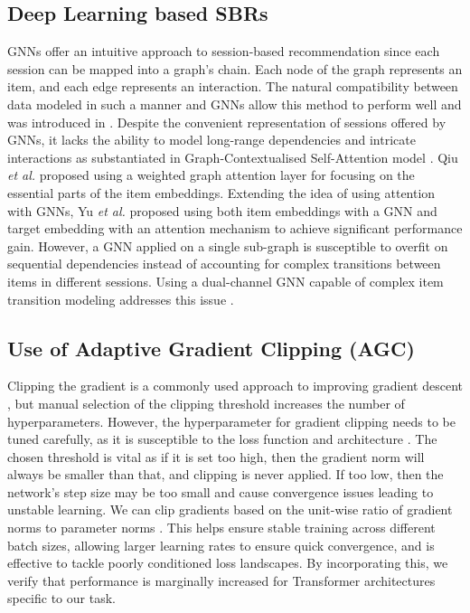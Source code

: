 \documentclass[conference]{IEEEtran}
\begin{document}
\subsection{Deep Learning based SBRs}




GNNs offer an intuitive approach to session-based recommendation since each session can be mapped into a graph's chain. Each node of the graph represents an item, and each edge represents an interaction. The natural compatibility between data modeled in such a manner and GNNs allow this method to perform well and was introduced in \cite{Wu:2019ke}. Despite the convenient representation of sessions offered by GNNs, it lacks the ability to model long-range dependencies and intricate interactions as substantiated in Graph-Contextualised Self-Attention model \cite{ijcai2019-547}. Qiu \textit{et al.} \cite{Rethinking} proposed using a weighted graph attention layer for focusing on the essential parts of the item embeddings. Extending the idea of using attention with GNNs, Yu \textit{et al.}\cite{yu2020tagnn} proposed using both item embeddings with a GNN and target embedding with an attention mechanism to achieve significant performance gain. However, a GNN applied on a single sub-graph is susceptible to overfit on sequential dependencies instead of accounting for complex transitions between items in different sessions. Using a dual-channel GNN capable of complex item transition modeling addresses this issue \cite{dgtn}. 









\subsection{Use of Adaptive Gradient Clipping (AGC)}

Clipping the gradient is a commonly used approach to improving gradient descent \cite{Zhang2020WhyGC}, but manual selection of the clipping threshold increases the number of hyperparameters. However, the hyperparameter for gradient clipping needs to be tuned carefully, as it is susceptible to the loss function and architecture \cite{9231926}. The chosen threshold is vital as if it is set too high, then the gradient norm will always be smaller than that, and clipping is never applied. If too low, then the network's step size may be too small and cause convergence issues leading to unstable learning. We can clip gradients based on the unit-wise ratio of gradient norms to parameter norms \cite{brock2021high}. This helps ensure stable training across different batch sizes, allowing larger learning rates to ensure quick convergence, and is effective to tackle poorly conditioned loss landscapes. By incorporating this, we verify that performance is marginally increased for Transformer architectures specific to our task.
\end{document}
